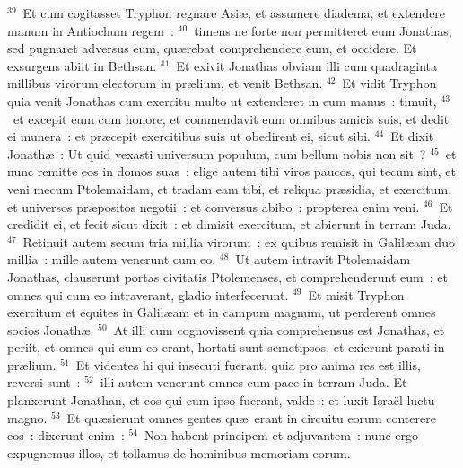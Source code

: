 ${}^{39}$~Et cum cogitasset Tryphon regnare Asi\ae , et assumere diadema, et extendere manum in Antiochum regem~:
${}^{40}$~timens ne forte non permitteret eum Jonathas, sed pugnaret adversus eum, qu\ae rebat comprehendere eum, et occidere. Et exsurgens abiit in Bethsan.
${}^{41}$~Et exivit Jonathas obviam illi cum quadraginta millibus virorum electorum in pr\ae lium, et venit Bethsan.
${}^{42}$~Et vidit Tryphon quia venit Jonathas cum exercitu multo ut extenderet in eum manus~: timuit,
${}^{43}$~et excepit eum cum honore, et commendavit eum omnibus amicis suis, et dedit ei munera~: et pr\ae cepit exercitibus suis ut obedirent ei, sicut sibi.
${}^{44}$~Et dixit Jonath\ae~: Ut quid vexasti universum populum, cum bellum nobis non sit~?
${}^{45}$~et nunc remitte eos in domos suas~: elige autem tibi viros paucos, qui tecum sint, et veni mecum Ptolemaidam, et tradam eam tibi, et reliqua pr\ae sidia, et exercitum, et universos pr\ae positos negotii~: et conversus abibo~: propterea enim veni.
${}^{46}$~Et credidit ei, et fecit sicut dixit~: et dimisit exercitum, et abierunt in terram Juda.
${}^{47}$~Retinuit autem secum tria millia virorum~: ex quibus remisit in Galil\ae am duo millia~: mille autem venerunt cum eo.
${}^{48}$~Ut autem intravit Ptolemaidam Jonathas, clauserunt portas civitatis Ptolemenses, et comprehenderunt eum~: et omnes qui cum eo intraverant, gladio interfecerunt.
${}^{49}$~Et misit Tryphon exercitum et equites in Galil\ae am et in campum magnum, ut perderent omnes socios Jonath\ae .
${}^{50}$~At illi cum cognovissent quia comprehensus est Jonathas, et periit, et omnes qui cum eo erant, hortati sunt semetipsos, et exierunt parati in pr\ae lium.
${}^{51}$~Et videntes hi qui insecuti fuerant, quia pro anima res est illis, reversi sunt~:
${}^{52}$~illi autem venerunt omnes cum pace in terram Juda. Et planxerunt Jonathan, et eos qui cum ipso fuerant, valde~: et luxit Isra\"el luctu magno.
${}^{53}$~Et qu\ae sierunt omnes gentes qu\ae\ erant in circuitu eorum conterere eos~: dixerunt enim~:
${}^{54}$~Non habent principem et adjuvantem~: nunc ergo expugnemus illos, et tollamus de hominibus memoriam eorum.

